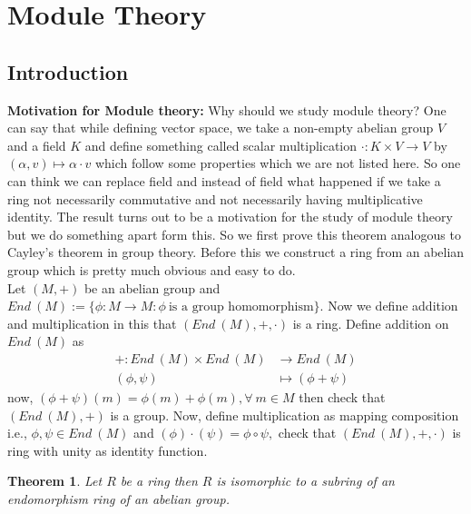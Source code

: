 \documentclass[11pt]{amsart}
\newtheorem{theorem}{Theorem}[section]
\begin{document}
\newpage
\section{Module Theory}
\subsection{Introduction}
\textbf{Motivation for Module theory:} Why should we study module theory? One can say that while defining vector space, we take a non-empty abelian group $V$ and a field $K$ and define something called scalar multiplication $\cdot :K\times V\to V$ by $(\alpha,v)\mapsto \alpha\cdot v$ which follow some properties which we are not listed here. So one can think we can replace field and instead of field what happened if we take a ring not necessarily commutative and not necessarily having multiplicative identity. The result turns out to be a motivation for the study of module theory but we do something apart form this. So we first prove this theorem analogous to Cayley's theorem in group theory. Before this we construct a ring from an abelian group which is pretty much obvious and easy to do.\\

Let $(M,+)$ be an abelian group and $End~(M):=\{\phi:M\to M: \phi~\text{is a group homomorphism}\}$. Now we define addition and multiplication in this that $(End~(M),+,\cdot)$ is a ring. Define addition on $End~(M)$ as \begin{align*}
+:End~(M)\times End~(M)&\to End~(M)\\
(\phi,\psi)&\mapsto (\phi+\psi)
\end{align*}
now, $(\phi+\psi)(m)=\phi(m)+\phi(m),\forall~m\in M$ then check that $(End~(M),+)$ is a group. Now, define multiplication as mapping composition i.e., $\phi,\psi\in End~(M)$ and $(\phi )\cdot (\psi)=\phi \circ \psi,$ check that $(End~(M),+,\cdot)$ is ring with unity as identity function.
\begin{theorem}
Let $R$ be a ring then $R$ is isomorphic to a subring of an endomorphism ring of an abelian group.
\end{theorem}
\end{document}
